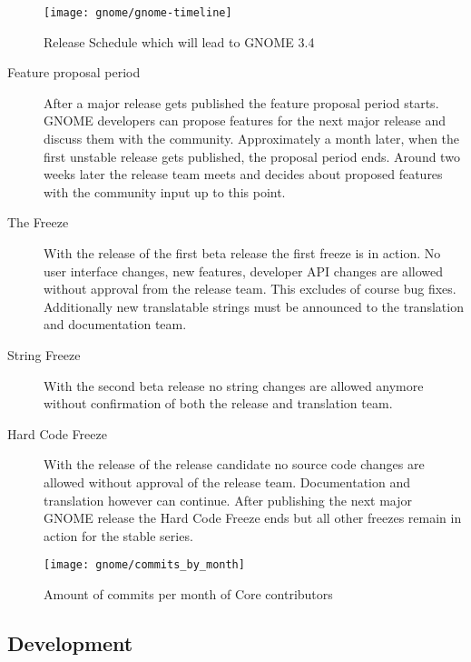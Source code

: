 \begin{figure}[htbp]
  \centering
  \texttt{[image: gnome/gnome-timeline]}
  \caption{Release Schedule which will lead to GNOME 3.4}
\end{figure}

\begin{description}

  \item[Feature proposal period] After a major release gets published the
    feature proposal period starts. GNOME developers can propose features for
    the next major release and discuss them with the community. Approximately a
    month later, when the first unstable release gets published, the proposal
    period ends. Around two weeks later the release team meets and decides
    about proposed features with the community input up to this point.

  \item[The Freeze] With the release of the first beta release the first freeze
    is in action. No user interface changes, new features, developer API
    changes are allowed without approval from the release team. This excludes
    of course bug fixes. Additionally new translatable strings must be
    announced to the translation and documentation team.

  \item[String Freeze] With the second beta release no string changes are
    allowed anymore without confirmation of both the release and translation
    team.

  \item[Hard Code Freeze] With the release of the release candidate no source
    code changes are allowed without approval of the release team.
    Documentation and translation however can continue. After publishing the
    next major GNOME release the Hard Code Freeze ends but all other freezes
    remain in action for the stable series.

\end{description}

\begin{figure}[htbp]
  \centering
  \texttt{[image: gnome/commits\_by\_month]}
  \caption{Amount of commits per month of Core contributors}
\end{figure}


\subsection{Development} %
\label{sub:Development}

